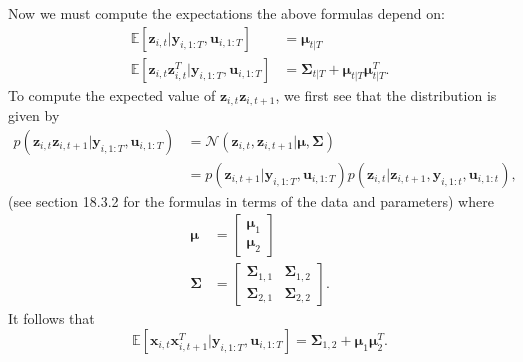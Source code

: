 \documentclass[a4paper,11pt]{article}
\begin{document}
Now we must compute the expectations the above formulas depend on:
\begin{align*}
	\mathbb{E}\left[ \mathbf{z}_{i,t} | \mathbf{y}_{i,1:T}, \mathbf{u}_{i,1:T} \right]
	&= \boldsymbol{\mu}_{t|T} \\
	\mathbb{E}\left[
	    \mathbf{z}_{i,t} \mathbf{z}_{i,t}^T
	    | \mathbf{y}_{i,1:T}, \mathbf{u}_{i,1:T}
	\right] &= \boldsymbol{\Sigma}_{t|T} + \boldsymbol{\mu}_{t|T}\boldsymbol{\mu}_{t|T}^T.
\end{align*}
To compute the expected value of $\mathbf{z}_{i,t} \mathbf{z}_{i,t+1}$, we first see that
the distribution is given by
\begin{align*}
	p(
		\mathbf{z}_{i,t} \mathbf{z}_{i,t+1}
		| \mathbf{y}_{i,1:T}, \mathbf{u}_{i,1:T}
	) &= \mathcal{N}(
		\mathbf{z}_{i,t}, \mathbf{z}_{i,t+1}
		| \boldsymbol{\mu}, \boldsymbol{\Sigma}
	) \\
	&= p( \mathbf{z}_{i,t+1} | \mathbf{y}_{i,1:T}, \mathbf{u}_{i,1:T} )
	p(
		\mathbf{z}_{i,t} | \mathbf{z}_{i,t+1}, \mathbf{y}_{i,1:t}, \mathbf{u}_{i,1:t}
	),
\end{align*}
(see section 18.3.2 for the formulas in terms of the data and parameters) where
\begin{align*}
    \boldsymbol{\mu} &= \begin{bmatrix}
		\boldsymbol{\mu}_1 \\ \boldsymbol{\mu}_2
	\end{bmatrix} \\
	\boldsymbol{\Sigma} &= \begin{bmatrix}
		\boldsymbol{\Sigma}_{1,1} & \boldsymbol{\Sigma}_{1,2} \\
		\boldsymbol{\Sigma}_{2,1} & \boldsymbol{\Sigma}_{2,2}
	\end{bmatrix}.
\end{align*}
It follows that
\[
	\mathbb{E}\left[
	    \mathbf{x}_{i,t} \mathbf{x}_{i,t+1}^T
		| \mathbf{y}_{i,1:T}, \mathbf{u}_{i,1:T}
	\right] = \boldsymbol{\Sigma}_{1,2} + \boldsymbol{\mu}_1\boldsymbol{\mu}_2^T.
\]
\end{document}
